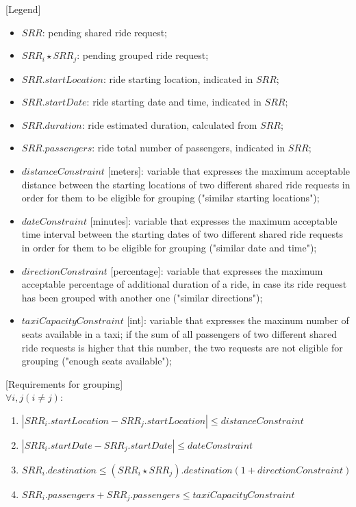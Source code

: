 	[Legend]
	\begin{itemize}
		\item $SRR$: pending shared ride request;
		\item $SRR_i \star SRR_j$: pending grouped ride request;
		\item $SRR.startLocation$: ride starting location, indicated in $SRR$;
		\item $SRR.startDate$: ride starting date and time, indicated in $SRR$;
		\item $SRR.duration$: ride estimated duration, calculated from $SRR$;
		\item $SRR.passengers$: ride total number of passengers, indicated in $SRR$;
		\item $distanceConstraint$ [meters]: variable that expresses the maximum acceptable distance between the starting locations of two different shared ride requests in order for them to be eligible for grouping ("similar starting locations");
		\item $dateConstraint$ [minutes]: variable that expresses the maximum acceptable time interval between the starting dates of two different shared ride requests in order for them to be eligible for grouping ("similar date and time");
		\item $directionConstraint$ [percentage]: variable that expresses the maximum acceptable percentage of additional duration of a ride, in case its ride request has been grouped with another one ("similar directions");
		\item $taxiCapacityConstraint$ [int]: variable that expresses the maxinum number of seats available in a taxi; if the sum of all passengers of two different shared ride requests is higher that this number, the two requests are not eligible for grouping ("enough seats available");
	\end{itemize}
	
	[Requirements for grouping]\\
	$\forall i,j (i \neq j)$:
	\begin{enumerate}
		\item $ | SRR_i.startLocation - SRR_j.startLocation | \leq distanceConstraint$
		\item $ | SRR_i.startDate - SRR_j.startDate | \leq dateConstraint $
		\item $ SRR_i.destination  \leq (SRR_i \star SRR_j).destination(1 + directionConstraint) $
		\item $ SRR_i.passengers + SRR_j.passengers \leq taxiCapacityConstraint $
	\end{enumerate} 
	
